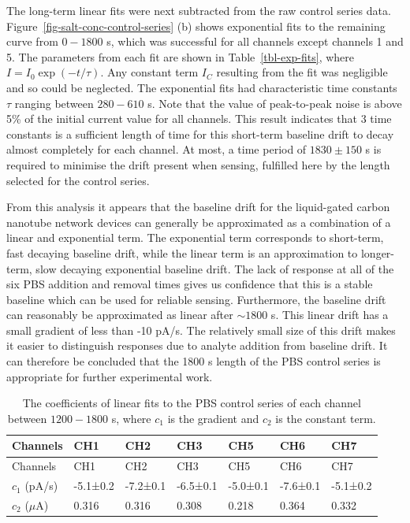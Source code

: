 \documentclass[
  a4paper,
]{scrbook}
\begin{document}
The long-term linear fits were next subtracted from the raw control
series data. Figure~\ref{fig-salt-conc-control-series} (b) shows
exponential fits to the remaining curve from \(0 - 1800\) s, which was
successful for all channels except channels 1 and 5. The parameters from
each fit are shown in Table~\ref{tbl-exp-fits}, where
\(I = I_0\exp(-t/\tau)\). Any constant term \(I_C\) resulting from the
fit was negligible and so could be neglected. The exponential fits had
characteristic time constants \(\tau\) ranging between \(280 - 610\) s.
Note that the value of peak-to-peak noise is above 5\% of the initial
current value for all channels. This result indicates that 3 time
constants is a sufficient length of time for this short-term baseline
drift to decay almost completely for each channel. At most, a time
period of \(1830 \pm 150\) s is required to minimise the drift present
when sensing, fulfilled here by the length selected for the control
series.

From this analysis it appears that the baseline drift for the
liquid-gated carbon nanotube network devices can generally be
approximated as a combination of a linear and exponential term. The
exponential term corresponds to short-term, fast decaying baseline
drift, while the linear term is an approximation to longer-term, slow
decaying exponential baseline drift. The lack of response at all of the
six PBS addition and removal times gives us confidence that this is a
stable baseline which can be used for reliable sensing. Furthermore, the
baseline drift can reasonably be approximated as linear after
\(\sim 1800\) s. This linear drift has a small gradient of less than -10
pA/s. The relatively small size of this drift makes it easier to
distinguish responses due to analyte addition from baseline drift. It
can therefore be concluded that the 1800 s length of the PBS control
series is appropriate for further experimental work.

\hypertarget{tbl-linear-fits}{}
\begin{longtable}[]{@{}lllllll@{}}
\caption{\label{tbl-linear-fits}The coefficients of linear fits to the
PBS control series of each channel between \(1200-1800\) s, where
\(c_1\) is the gradient and \(c_2\) is the constant term.\\
}\tabularnewline
\toprule\noalign{}
Channels & CH1 & CH2 & CH3 & CH5 & CH6 & CH7 \\
\midrule\noalign{}
\endfirsthead
\toprule\noalign{}
Channels & CH1 & CH2 & CH3 & CH5 & CH6 & CH7 \\
\midrule\noalign{}
\endhead
\bottomrule\noalign{}
\endlastfoot
\(c_1\) (pA/s) & -5.1±0.2 & -7.2±0.1 & -6.5±0.1 & -5.0±0.1 & -7.6±0.1 &
-5.1±0.2 \\
\(c_2\) (\(\mu\)A) & 0.316 & 0.316 & 0.308 & 0.218 & 0.364 & 0.332 \\
\end{longtable}
\end{document}
